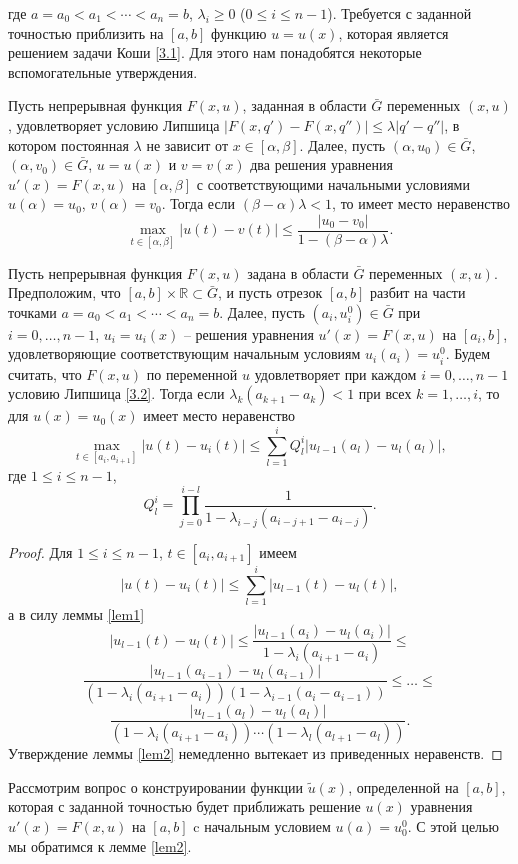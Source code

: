 где $a=a_0<a_1<\cdots<a_n=b$,  $\lambda_i\geq0$ ($0\leq i\leq n-1$). Требуется с заданной точностью приблизить на $[a,b]$ функцию  $u=u(x)$, которая является   решением задачи Коши \eqref{3.1}. Для этого нам понадобятся некоторые вспомогательные утверждения.
\begin{lemma}\label{lem1} Пусть непрерывная функция  $F(x,u)$, заданная в области $\bar  G$ переменных $(x,u)$, удовлетворяет условию Липшица $|F(x,q')-F(x,q'')|\le\lambda|q'-q''|$, в котором постоянная $\lambda$ не зависит от $x\in [\alpha,\beta]$.  Далее, пусть  $(\alpha,u_0)\in \bar G$, $(\alpha,v_0)\in \bar  G$, $u= u(x)$ и $v =v(x)$ два решения уравнения $u'(x)=F(x,u)$   на $[\alpha,\beta]$  с соответствующими начальными условиями  $u(\alpha)=u_0$,  $v(\alpha)=v_0$. Тогда если $(\beta-\alpha)\lambda<1$, то имеет место неравенство
	$$
	\max_{t\in[\alpha,\beta]}|u(t)-v(t)|\le \frac{|u_0-v_0|}{1-(\beta-\alpha)\lambda}.
	$$
\end{lemma}
\begin{lemma}\label{lem2} Пусть непрерывная функция  $F(x,u)$ задана в области $\bar  G$ переменных $(x,u)$. Предположим, что $[a,b]\times\mathbb{R}\subset \bar G$, и пусть отрезок  $[a,b]$ разбит на части точками $a=a_0<a_1<\cdots<a_n=b$.   Далее, пусть  $(a_i,u_i^0)\in \bar G$ при $i=0,\ldots,n-1$, $u_i= u_i(x)$ -- решения уравнения $u'(x)=F(x,u)$   на $[a_i,b]$, удовлетворяющие соответствующим начальным условиям  $u_i(a_i)=u_i^0$. Будем считать, что $F(x,u)$ по переменной $u$  удовлетворяет при каждом $i=0,\ldots,n-1$ условию Липшица \eqref{3.2}.   Тогда если $\lambda_{k}(a_{k+1}-a_k)<1$ при всех $k=1,\ldots,i$, то для $u(x)=u_0(x)$ имеет место неравенство
	$$
	\max_{t\in[a_i,a_{i+1}]}|u(t)-u_i(t)|\le \sum_{l=1}^{i}Q_{l}^{i}|u_{l-1}(a_{l})-u_{l}(a_l)|,
	$$
	где $1\le i\le n-1$,
	$$
	Q_l^i=\prod_{j=0}^{i-l}\frac{1}{1-\lambda_{i-j}(a_{i-j+1}-a_{i-j})}.
	$$
\end{lemma}
\begin{proof}
	Для $1\le i\le n-1$, $t\in[a_i,a_{i+1}]$ имеем
	$$
	|u(t)-u_i(t)|\le \sum_{l=1}^{i}|u_{l-1}(t)-u_l(t)|,
	$$
	а в силу леммы \ref{lem1}
	$$
	|u_{l-1}(t)-u_l(t)|\le \frac{|u_{l-1}(a_i)-u_{l}(a_i)|}{1-\lambda_i(a_{i+1}-a_i)}\le
	$$
	$$
	\frac{|u_{l-1}(a_{i-1})-u_{l}(a_{i-1})|}
	{(1-\lambda_i(a_{i+1}-a_i))(1-\lambda_{i-1}(a_{i}-a_{i-1}))}\le\ldots\le
	$$
	$$
	\frac{|u_{l-1}(a_{l})-u_{l}(a_{l})|}
	{(1-\lambda_i(a_{i+1}-a_i))\cdots(1-\lambda_{l}(a_{l+1}-a_{l}))}.
	$$
	Утверждение леммы \ref{lem2} немедленно вытекает из приведенных неравенств.
\end{proof}
Рассмотрим вопрос о конструировании функции $\tilde u(x)$, определенной на $[a,b]$, которая с заданной точностью будет   приближать  решение $u(x)$ уравнения  $u'(x)=F(x,u)$  на $[a,b]$  c начальным условием  $u(a)=u^0_0$. С этой целью мы обратимся к лемме \ref{lem2}.
